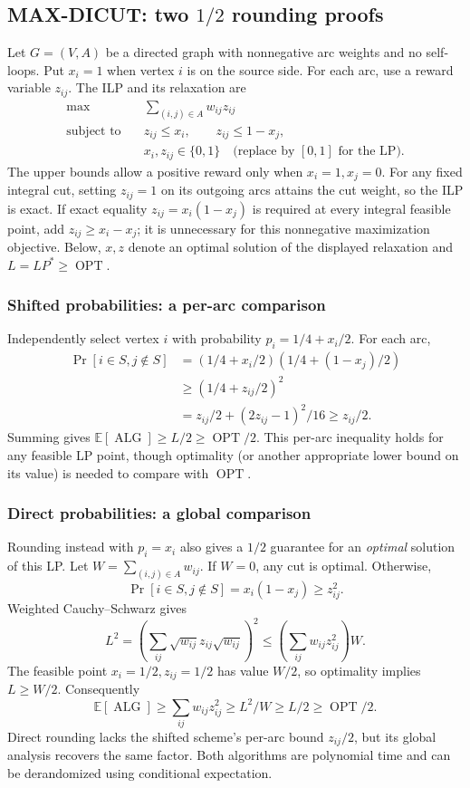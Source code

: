 \documentclass[10pt]{article}
\theoremstyle{definition}
\newcommand{\OPT}{\operatorname{OPT}}
\newcommand{\ALG}{\operatorname{ALG}}
\begin{document}
\subsection{MAX-DICUT: two \texorpdfstring{$1/2$}{1/2} rounding proofs}\label{lp:dicut}
Let $G=(V,A)$ be a directed graph with nonnegative arc weights and no
self-loops. Put $x_i=1$ when vertex $i$ is on the source side. For each arc,
use a reward variable $z_{ij}$. The ILP and its relaxation are
\[
  \begin{aligned}
    \max\quad&\sum_{(i,j)\in A}w_{ij}z_{ij}\\
    \text{subject to}\quad&z_{ij}\le x_i,\qquad z_{ij}\le1-x_j,\\
    &x_i,z_{ij}\in\{0,1\}\quad
       \text{(replace by }[0,1]\text{ for the LP).}
  \end{aligned}
\]
The upper bounds allow a positive reward only when $x_i=1,x_j=0$.
For any fixed integral cut, setting $z_{ij}=1$ on its outgoing arcs attains
the cut weight, so the ILP is exact. If exact equality
$z_{ij}=x_i(1-x_j)$ is required at every integral feasible point, add
$z_{ij}\ge x_i-x_j$; it is unnecessary for this nonnegative maximization
objective. Below, $x,z$ denote an optimal solution of the displayed
relaxation and $L=LP^*\ge\OPT$.

\subsubsection*{Shifted probabilities: a per-arc comparison}
Independently select vertex $i$ with probability $p_i=1/4+x_i/2$.
For each arc,
\[
  \begin{aligned}
    \Pr[i\in S,j\notin S]
      &=(1/4+x_i/2)(1/4+(1-x_j)/2)\\
      &\ge(1/4+z_{ij}/2)^2\\
      &=z_{ij}/2+(2z_{ij}-1)^2/16\ge z_{ij}/2.
  \end{aligned}
\]
Summing gives $\mathbb E[\ALG]\ge L/2\ge\OPT/2$.
This per-arc inequality holds for any feasible LP point, though optimality
(or another appropriate lower bound on its value) is needed to compare
with $\OPT$.

\subsubsection*{Direct probabilities: a global comparison}
Rounding instead with $p_i=x_i$ also gives a $1/2$ guarantee for an
\emph{optimal} solution of this LP. Let $W=\sum_{(i,j)\in A}w_{ij}$.
If $W=0$, any cut is optimal. Otherwise,
\[
  \Pr[i\in S,j\notin S]=x_i(1-x_j)\ge z_{ij}^2.
\]
Weighted Cauchy--Schwarz gives
\[
  L^2=\left(\sum_{ij}\sqrt{w_{ij}}z_{ij}\sqrt{w_{ij}}\right)^2
    \le\left(\sum_{ij}w_{ij}z_{ij}^2\right)W.
\]
The feasible point $x_i=1/2,z_{ij}=1/2$ has value $W/2$, so optimality
implies $L\ge W/2$. Consequently
\[
  \mathbb E[\ALG]\ge\sum_{ij}w_{ij}z_{ij}^2
    \ge L^2/W\ge L/2\ge\OPT/2.
\]
Direct rounding lacks the shifted scheme's per-arc bound $z_{ij}/2$,
but its global analysis recovers the same factor. Both algorithms are
polynomial time and can be derandomized using conditional expectation.
\end{document}
